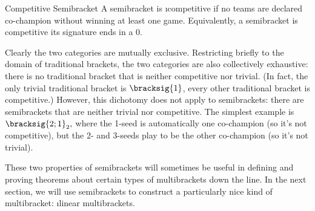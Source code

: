 {    \begin{definition}{Competitive Semibracket}{}
        A semibracket is \i{competitive} if no teams are declared co-champion without winning at least one game. Equivalently, a semibracket is competitive its signature ends in a $0.$
    \end{definition}

    Clearly the two categories are mutually exclusive. Restricting briefly to the domain of traditional brackets, the two categories are also collectively exhaustive: there is no traditional bracket that is neither competitive nor trivial. (In fact, the only trivial traditional bracket is $\bracksig{1}$, every other traditional bracket is competitive.) However, this dichotomy does not apply to semibrackets: there are semibrackets that are neither trivial nor competitive. The simplest example is $\bracksig{2;1}_2,$ where the 1-seed is automatically one co-champion (so it's not competitive), but the 2- and 3-seeds play to be the other co-champion (so it's not trivial).


    These two properties of semibrackets will sometimes be useful in defining and proving theorems about certain types of multibrackets down the line. In the next section, we will use semibrackets to construct a particularly nice kind of multibracket: \i{linear multibrackets.}
}